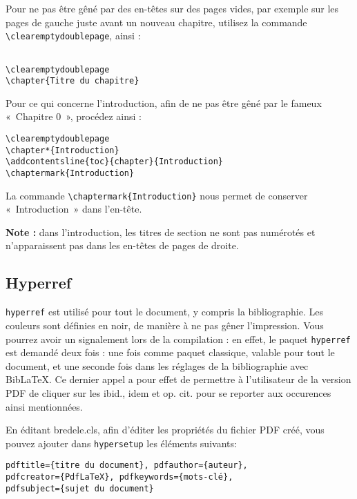 \documentclass[10pt,a4paper]{article}
\begin{document}
Pour ne pas être gêné par des en-têtes sur des pages vides, par exemple sur les pages de gauche juste avant un nouveau chapitre, utilisez la commande \verb!\clearemptydoublepage!, ainsi :

\begin{Verbatim}[frame=single, framerule=0.2mm, rulecolor=\color{gray}, label=clearemptydoublepage]

\clearemptydoublepage
\chapter{Titre du chapitre}
\end{Verbatim}

Pour ce qui concerne l'introduction, afin de ne pas être gêné par le fameux «~Chapitre 0~», procédez ainsi :


\begin{Verbatim}[frame=single, framerule=0.2mm, rulecolor=\color{gray}, label=Pour l'intro]
\clearemptydoublepage
\chapter*{Introduction}
\addcontentsline{toc}{chapter}{Introduction}
\chaptermark{Introduction}
\end{Verbatim}

La commande \verb!\chaptermark{Introduction}! nous permet de conserver «~Introduction~» dans l'en-tête.

\textbf{Note :} dans l'introduction, les titres de section ne sont pas numérotés et n'apparaissent pas dans les en-têtes de pages de droite.


\subsection{Hyperref}
\verb!hyperref! est utilisé pour tout le document, y compris la bibliographie. Les couleurs sont définies en noir, de manière à ne pas g\^ener l'impression. Vous pourrez avoir un signalement lors de la compilation : en effet, le paquet \verb!hyperref! est demandé deux fois : une fois comme paquet classique, valable pour tout le document, et une seconde fois dans les réglages de la bibliographie avec BibLaTeX. Ce dernier appel a pour effet de permettre à l'utilisateur de la version PDF de cliquer sur les ibid., idem et op. cit. pour se reporter aux occurences ainsi mentionnées.

En éditant bredele.cls, afin d'éditer les propriétés du fichier PDF créé, vous pouvez ajouter dans \verb!hypersetup! les éléments suivants: 
\begin{Verbatim}[frame=single, framerule=0.2mm, rulecolor=\color{gray}]
pdftitle={titre du document}, pdfauthor={auteur},
pdfcreator={PdfLaTeX}, pdfkeywords={mots-clé},
pdfsubject={sujet du document}
\end{Verbatim}
\end{document}
